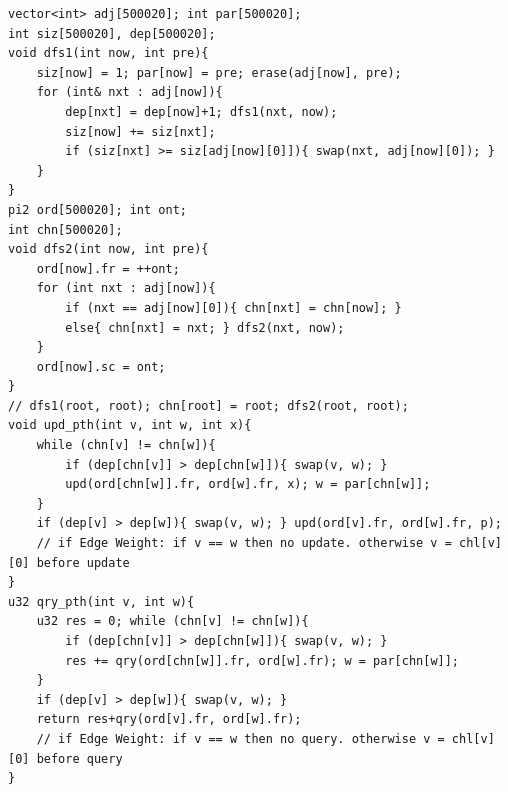 \begin{verbatim}
vector<int> adj[500020]; int par[500020];
int siz[500020], dep[500020];
void dfs1(int now, int pre){
	siz[now] = 1; par[now] = pre; erase(adj[now], pre);
	for (int& nxt : adj[now]){
		dep[nxt] = dep[now]+1; dfs1(nxt, now);
		siz[now] += siz[nxt];
		if (siz[nxt] >= siz[adj[now][0]]){ swap(nxt, adj[now][0]); }
	}
}
pi2 ord[500020]; int ont;
int chn[500020];
void dfs2(int now, int pre){
	ord[now].fr = ++ont;
	for (int nxt : adj[now]){
		if (nxt == adj[now][0]){ chn[nxt] = chn[now]; }
		else{ chn[nxt] = nxt; } dfs2(nxt, now);
	}
	ord[now].sc = ont;
}
// dfs1(root, root); chn[root] = root; dfs2(root, root);
void upd_pth(int v, int w, int x){
	while (chn[v] != chn[w]){
		if (dep[chn[v]] > dep[chn[w]]){ swap(v, w); }
		upd(ord[chn[w]].fr, ord[w].fr, x); w = par[chn[w]];
	}
	if (dep[v] > dep[w]){ swap(v, w); } upd(ord[v].fr, ord[w].fr, p);
	// if Edge Weight: if v == w then no update. otherwise v = chl[v][0] before update
}
u32 qry_pth(int v, int w){
	u32 res = 0; while (chn[v] != chn[w]){
		if (dep[chn[v]] > dep[chn[w]]){ swap(v, w); }
		res += qry(ord[chn[w]].fr, ord[w].fr); w = par[chn[w]];
	}
	if (dep[v] > dep[w]){ swap(v, w); }
	return res+qry(ord[v].fr, ord[w].fr);
	// if Edge Weight: if v == w then no query. otherwise v = chl[v][0] before query
}
\end{verbatim}